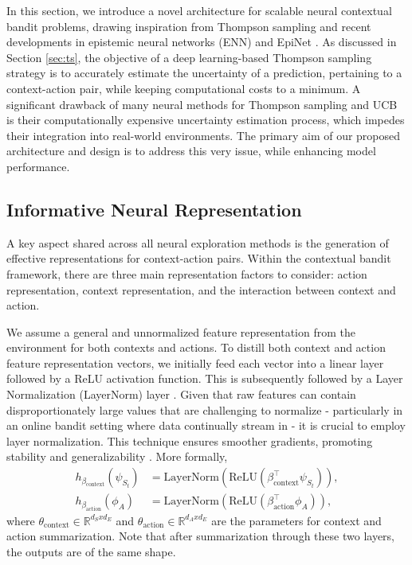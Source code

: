 In this section, we introduce a novel architecture for scalable neural contextual bandit problems, drawing inspiration from Thompson sampling and recent developments in epistemic neural networks (ENN) and EpiNet \cite{osband2021epistemic}. As discussed in Section \ref{sec:ts}, the objective of a deep learning-based Thompson sampling strategy is to accurately estimate the uncertainty of a prediction, pertaining to a context-action pair, while keeping computational costs to a minimum. A significant drawback of many neural methods for Thompson sampling and UCB is their computationally expensive uncertainty estimation process, which impedes their integration into real-world environments. The primary aim of our proposed architecture and design is to address this very issue, while enhancing model performance.

\subsection{Informative Neural Representation}
A key aspect shared across all neural exploration methods is the generation of effective representations for context-action pairs. Within the contextual bandit framework, there are three main representation factors to consider: action representation, context representation, and the interaction between context and action.

We assume a general and unnormalized feature representation from the environment for both contexts and actions. To distill both context and action feature representation vectors, we initially feed each vector into a linear layer followed by a ReLU activation function. This is subsequently followed by a Layer Normalization (LayerNorm) layer \cite{ba2016layer}. Given that raw features can contain disproportionately large values that are challenging to normalize - particularly in an online bandit setting where data continually stream in - it is crucial to employ layer normalization. This technique ensures smoother gradients, promoting stability and generalizability \cite{xu2019understanding}. More formally, 
\begin{equation}
\begin{split}
    h_{\beta_{\text{context}}}(\psi_{S_t}) &= \text{LayerNorm}(\text{ReLU}(\beta_{\text{context}}^\top\psi_{S_t})),\\
    h_{\beta_{\text{action}}}(\phi_A) &= \text{LayerNorm}(\text{ReLU}(\beta_{\text{action}}^\top\phi_A)),
\end{split}
\end{equation}
where $\theta_{\text{context}} \in \mathbb{R}^{d_{S} x d_{E}}$ and $\theta_{\text{action}} \in \mathbb{R}^{d_{A} x d_{E}}$ are the parameters for context and action summarization. Note that after summarization through these two layers, the outputs are of the same shape.

